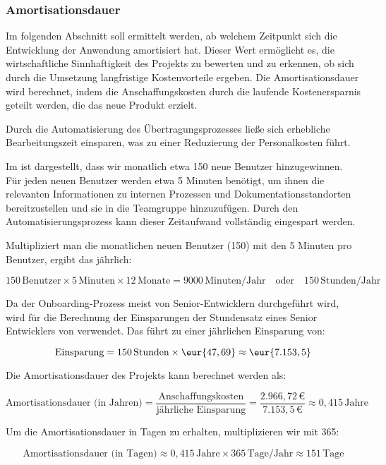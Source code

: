 \subsubsection{Amortisationsdauer}
\label{sec:Amortisationsdauer}

Im folgenden Abschnitt soll ermittelt werden, ab welchem Zeitpunkt sich die Entwicklung der Anwendung amortisiert hat. Dieser Wert ermöglicht es, die wirtschaftliche Sinnhaftigkeit des Projekts zu bewerten und zu erkennen, ob sich durch die Umsetzung langfristige Kostenvorteile ergeben. Die Amortisationsdauer wird berechnet, indem die Anschaffungskosten durch die laufende Kostenersparnis geteilt werden, die das neue Produkt erzielt. 

Durch die Automatisierung des Übertragungsprozesses ließe sich erhebliche Bearbeitungszeit einsparen, was zu einer Reduzierung der Personalkosten führt.

Im  ist dargestellt, dass wir monatlich etwa 150 neue Benutzer hinzugewinnen. Für jeden neuen Benutzer werden etwa 5 Minuten benötigt, um ihnen die relevanten Informationen zu internen Prozessen und Dokumentationsstandorten bereitzustellen und sie in die Teamgruppe hinzuzufügen. Durch den Automatisierungsprozess kann dieser Zeitaufwand vollständig eingespart werden.

Multipliziert man die monatlichen neuen Benutzer (150) mit den 5 Minuten pro Benutzer, ergibt das jährlich:

\[
150 \, \text{Benutzer} \times 5 \, \text{Minuten} \times 12 \, \text{Monate} = 9000 \, \text{Minuten/Jahr} \quad \text{oder} \quad 150 \, \text{Stunden/Jahr}
\]

Da der Onboarding-Prozess meist von Senior-Entwicklern durchgeführt wird, wird für die Berechnung der Einsparungen der Stundensatz eines Senior Entwicklers von  verwendet. Das führt zu einer jährlichen Einsparung von:

\[
\text{Einsparung} = 150 \, \text{Stunden} \times \eur{47,69} \approx \eur{7.153,5}
\]

Die Amortisationsdauer des Projekts kann berechnet werden als:

\[
\text{Amortisationsdauer (in Jahren)} = \frac{\text{Anschaffungskosten}}{\text{jährliche Einsparung}} = \frac{2.966,72 \, \text{€}}{7.153,5 \, \text{€}} \approx 0,415 \, \text{Jahre}
\]

Um die Amortisationsdauer in Tagen zu erhalten, multiplizieren wir mit 365:

\[
\text{Amortisationsdauer (in Tagen)} \approx 0,415 \, \text{Jahre} \times 365 \, \text{Tage/Jahr} \approx 151 \, \text{Tage}
\]

